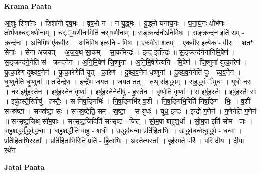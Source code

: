 \documentclass[17pt]{extarticle}
\begin{document}
\textbf{Krama Paata} \newline

आ॒शुः शिशा॑नः । शिशा॑नो वृष॒भः । वृ॒ष॒भो न । न यु॒द्ध्मः । यु॒द्ध्मो घ॑नाघ॒नः । घ॒ना॒घ॒नः क्षोभ॑णः । क्षोभ॑णश्चर्.षणी॒नाम् । च॒र्.॒ष॒णी॒नामिति॑ चर्.षणी॒नाम् ॥ स॒ङ्क्रन्द॑नोऽनिमि॒षः । स॒ङ्क्रन्द॑न॒ इति॑ सम् - क्रन्द॑नः । अ॒नि॒मि॒ष ए॑कवी॒रः । अ॒नि॒मि॒ष इत्य॑नि - मि॒षः । ए॒क॒वी॒रः श॒तम् । ए॒क॒वी॒र इत्ये॑क - वी॒रः । श॒तꣳ सेनाः᳚ । सेना॑ अजयत् । अ॒ज॒य॒थ् सा॒कम् । सा॒कमिन्द्रः॑ । इन्द्र॒ इतीन्द्रः॑ ॥ स॒ङ्क्रन्द॑नेनानिमि॒षेण॑ । स॒ङ्क्रन्द॑ने॒नेति॑ सं - क्रन्द॑नेन । अ॒नि॒मि॒षेण॑ जि॒ष्णुना᳚ । अ॒नि॒मि॒षेणेत्य॑नि - मि॒षेण॑ । जि॒ष्णुना॑ युत्का॒रेण॑ । यु॒त्का॒रेण॑ दुश्च्यव॒नेन॑ । यु॒त्का॒रेणेति॑ युत् - का॒रेण॑ । दु॒श्च्य॒व॒नेन॑ धृ॒ष्णुना᳚ । दु॒श्च्य॒व॒नेनेति॑ दुः - च्य॒व॒नेन॑ । धृ॒ष्णुनेति॑ धृ॒ष्णुना᳚ ॥ तदिन्द्रे॑ण । इन्द्रे॑ण जयत । ज॒य॒त॒ तत् । तथ् स॑हद्ध्वम् । स॒ह॒द्ध्वं॒ ॅयुधः॑ । युधो॑ नरः । न॒र॒ इषु॑हस्तेन । इषु॑हस्तेन॒ वृष्णा᳚ । इषु॑हस्ते॒नेतीषु॑ - ह॒स्ते॒न॒ । वृष्णेति॒ वृष्णा᳚ ॥ स इषु॑हस्तैः । इषु॑हस्तैः॒ सः । इषु॑हस्तै॒रितीषु॑ - ह॒स्तैः॒ । स नि॑ष॒ङ्गिभिः॑ । नि॒ष॒ङ्गिभि॑र् व॒शी । नि॒ष॒ङ्गिभि॒रिति॑ निष॒ङ्गि - भिः॒ । व॒शी सꣳस्र॑ष्टा । सꣳस्र॑ष्टा॒ सः । सꣳस्र॒ष्टेति॒ सम् - स्र॒ष्टा॒ । स युधः॑ । युध॒ इन्द्रः॑ । इन्द्रो॑ ग॒णेन॑ । ग॒णेनेति॑ ग॒णेन॑ ॥ सꣳ॒॒सृ॒ष्ट॒जिथ् सो॑म॒पाः । सꣳ॒॒सृ॒ष्ट॒जिदिति॑ सꣳसृष्ट - जित् । सो॒म॒पा बा॑हुश॒र्धी । सो॒म॒पा इति॑ सोम - पाः । बा॒हु॒श॒र्द्ध्यू᳚र्द्ध्वद्ध॑न्वा । बा॒हु॒श॒र्द्धीति॑ बाहु - श॒र्धी । ऊ॒र्द्ध्वध॑न्वा॒ प्रति॑हिताभिः । ऊ॒र्द्ध्वध॒न्वेत्यू॒र्द्ध्व - ध॒न्वा॒ । प्रति॑हिताभि॒रस्ता᳚ । प्रति॑हिताभि॒रिति॒ प्रति॑ - हि॒ता॒भिः॒ । अस्तेत्यस्ता᳚ ॥ बृह॑स्पते॒ परि॑ । परि॑ दीय । दी॒या॒ रथे॑न \newline

\textbf{Jatai Paata} \newline
\end{document}
